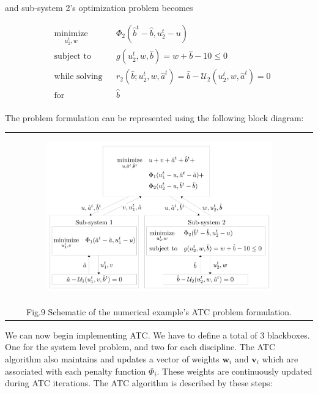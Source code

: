 \documentclass[11pt]{article}
\begin{document}
and sub-system 2's optimization problem becomes

\begin{equation*}
    \begin{aligned}
        & \underset{u_2^t,w}{\text{minimize}}
        & & \Phi_2(\hat{b}^t - \hat{b},u_2^t - u)\\
        & \text{subject to}
        & & g({u}_2^t,w,\hat{b}) = w + \hat{b} - 10 \leq 0\\
        & \text{while solving}
        & & r_2(\hat{b};u_2^t,w,\hat{a}^t) = \hat{b} - \mathcal{U}_2(u_2^t,w,\hat{a}^t) = 0\\
        & \text{for}
        & & \hat{b}\\
    \end{aligned}
    \tag{11}
\end{equation*}

The problem formulation can be represented using the following block
diagram:

\begin{longtable}[]{@{}c@{}}
\toprule
\endhead
\begin{minipage}[t]{0.97\columnwidth}\centering
    \begin{figure}
        \centering
        \includegraphics[width=0.9\textwidth]{images/ATC_diagram_numerical.png}
    \end{figure}
\end{minipage}\tabularnewline
Fig.9 Schematic of the numerical example's ATC problem formulation.\tabularnewline
\bottomrule
\end{longtable}

We can now begin implementing ATC. We have to define a total of 3
blackboxes. One for the system level problem, and two for each
discipline. The ATC algorithm also maintains and updates a vector of
weights \(\mathbf{w}_i\) and \(\mathbf{v}_i\) which are associated with
each penalty function \(\Phi_i\). These weights are continuously updated
during ATC iterations. The ATC algorithm is described by these steps:
\end{document}
